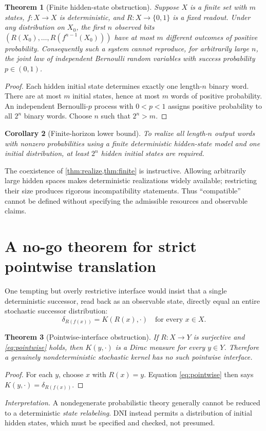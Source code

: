 \documentclass[11pt,letterpaper]{article}
\newtheorem{theorem}{Theorem}[section]
\newtheorem{corollary}[theorem]{Corollary}
\theoremstyle{definition}
\theoremstyle{remark}
\begin{document}
\begin{theorem}[Finite hidden-state obstruction]\label{thm:finite}
Suppose $X$ is a finite set with $m$ states, $f:X\to X$ is deterministic, and $R:X\to\{0,1\}$ is a fixed readout. Under \emph{any} distribution on $X_0$, the first $n$ observed bits $(R(X_0),\ldots,R(f^{n-1}(X_0)))$ have at most $m$ different outcomes of positive probability. Consequently such a system cannot reproduce, for arbitrarily large $n$, the joint law of independent Bernoulli random variables with success probability $p\in(0,1)$.
\end{theorem}
\begin{proof}
Each hidden initial state determines exactly one length-$n$ binary word. There are at most $m$ initial states, hence at most $m$ words of positive probability. An independent Bernoulli-$p$ process with $0<p<1$ assigns positive probability to all $2^n$ binary words. Choose $n$ such that $2^n>m$.
\end{proof}
\begin{corollary}[Finite-horizon lower bound]
To realize \emph{all} length-$n$ output words with nonzero probabilities using a finite deterministic hidden-state model and one initial distribution, at least $2^n$ hidden initial states are required.
\end{corollary}

The coexistence of \cref{thm:realize,thm:finite} is instructive. Allowing arbitrarily large hidden spaces makes deterministic realizations widely available; restricting their size produces rigorous incompatibility statements. Thus ``compatible'' cannot be defined without specifying the admissible resources and observable claims.

\section{A no-go theorem for strict pointwise translation}
One tempting but overly restrictive interface would insist that a single deterministic successor, read back as an observable state, directly equal an entire stochastic successor distribution:
\begin{equation}\label{eq:pointwise}
\delta_{R(f(x))}=K(R(x),\cdot)\quad\text{for every }x\in X.
\end{equation}
\begin{theorem}[Pointwise-interface obstruction]\label{thm:pointwise}
If $R:X\to Y$ is surjective and \eqref{eq:pointwise} holds, then $K(y,\cdot)$ is a Dirac measure for every $y\in Y$. Therefore a genuinely nondeterministic stochastic kernel has no such pointwise interface.
\end{theorem}
\begin{proof}
For each $y$, choose $x$ with $R(x)=y$. Equation \eqref{eq:pointwise} then says $K(y,\cdot)=\delta_{R(f(x))}$.
\end{proof}
\emph{Interpretation.} A nondegenerate probabilistic theory generally cannot be reduced to a deterministic \emph{state relabeling}. DNI instead permits a distribution of initial hidden states, which must be specified and checked, not presumed.
\end{document}
